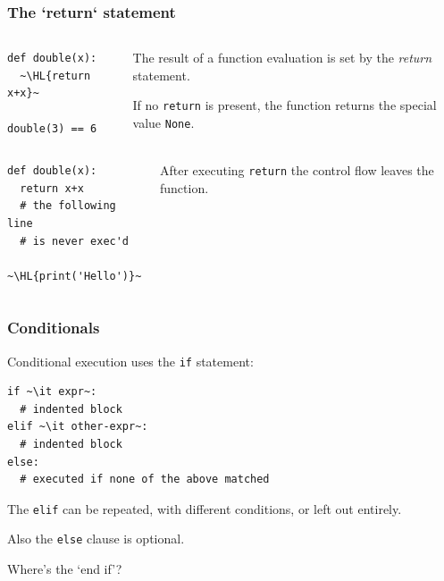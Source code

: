 \documentclass[english,serif,mathserif,xcolor=pdftex,dvipsnames,table]{beamer}
\begin{document}
\begin{frame}[fragile]
  \frametitle{The `return` statement}

  \begin{columns}
    \begin{column}{0.5\textwidth}
      \begin{lstlisting}
def double(x):
  ~\HL{return x+x}~

double(3) == 6
      \end{lstlisting}
    \end{column}
    \begin{column}{0.5\textwidth}
      \raggedleft The result of a function evaluation is set by the
      \textit{return} statement.
 
     \+
      If no \texttt{return} is present, the function returns the
      special value \texttt{None}.

         \end{column}
  \end{columns}
\+
  \begin{columns}
    \begin{column}{0.5\textwidth}
      \begin{lstlisting}
def double(x):
  return x+x
  # the following line 
  # is never exec'd
  ~\HL{print('Hello')}~
      \end{lstlisting}
    \end{column}
    \begin{column}{0.5\textwidth}
      \raggedleft After executing \texttt{return} the control flow
      leaves the function.
    \end{column}
  \end{columns}

\end{frame}


\begin{frame}[fragile]
  \frametitle{Conditionals}
  Conditional execution uses the \texttt{if} statement:
\begin{lstlisting}
if ~\it expr~:
  # indented block
elif ~\it other-expr~:
  # indented block
else:
  # executed if none of the above matched
\end{lstlisting}

  \+The \texttt{elif} can be repeated, with different conditions, or
  left out entirely.

  \+
  Also the \texttt{else} clause is optional.

  \+
  \begin{question}
    Where's the `end if'?

  \end{question}
\end{frame}
\end{document}
